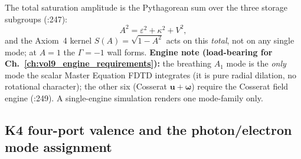 \noindent
The total saturation amplitude is the Pythagorean sum over the three storage subgroups (:247):
\begin{equation}
A^2 = \varepsilon^2 + \kappa^2 + V^2,
\label{eq:vol9_pythagorean_amplitude}
\end{equation}
and the Axiom~4 kernel $S(A) = \sqrt{1 - A^2}$ acts on this \emph{total}, not on any single mode; at $A = 1$ the $\Gamma = -1$\gammaundeclared{} wall forms. \textbf{Engine note (load-bearing for Ch.~\ref{ch:vol9_engine_requirements}):} the breathing $A_1$ mode is the \emph{only} mode the scalar Master Equation FDTD integrates (it is pure radial dilation, no rotational character); the other six (Cosserat $\mathbf{u} + \boldsymbol{\omega}$) require the Cosserat field engine (:249). A single-engine simulation renders one mode-family only.

\subsection{K4 four-port valence and the photon/electron mode assignment}
\label{subsec:vol9_k4_valence}

